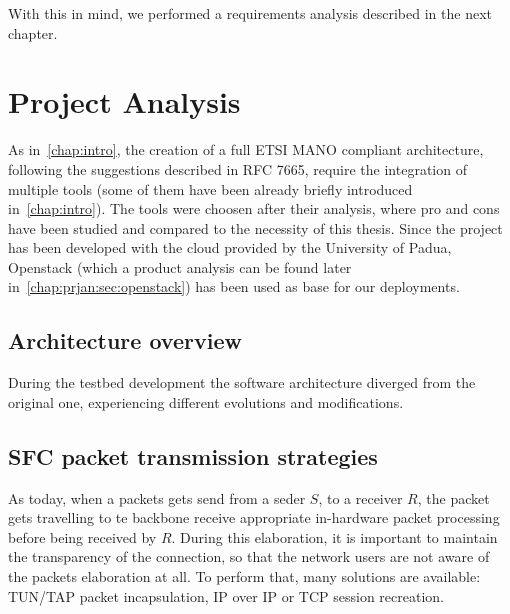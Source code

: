 \documentclass[10pt]{book}
\begin{document}
\noindent With this in mind, we performed a requirements analysis described in 
the next chapter.

\chapter{Project Analysis}
\label{chap:prjan}

As in~\ref{chap:intro}, the creation of a full ETSI MANO compliant
architecture, following the suggestions described in RFC 7665, require the 
integration of multiple tools (some of them have been already briefly 
introduced in~\ref{chap:intro}). The tools were choosen after their 
analysis, where pro and cons have been studied and compared to the necessity of 
this thesis. Since the project has been developed with the cloud provided by 
the University of Padua, Openstack (which a product analysis can be found later 
in~\ref{chap:prjan:sec:openstack}) has been used as base for our deployments.

\section{Architecture overview}

During the testbed development the software architecture diverged from the 
original one, experiencing different evolutions and modifications.

\section{SFC packet transmission strategies}

As today, when a packets gets send from a seder $S$, to a receiver $R$, the 
packet gets travelling to te backbone receive appropriate in-hardware packet 
processing before being received by $R$. During this elaboration, it is 
important to maintain the transparency of the connection, so that the network 
users are not aware of the packets elaboration at all. To perform that, many 
solutions are available: TUN/TAP packet incapsulation, IP over IP or TCP 
session recreation.
\end{document}
